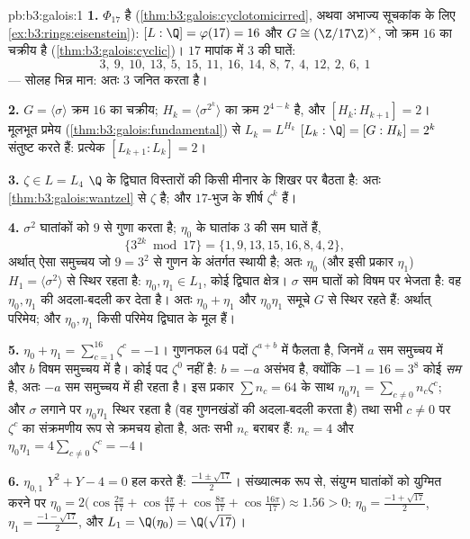 \begin{solution}{pb:b3:galois:1}
\textbf{1.} $\Phi_{17}$  है (\cref{thm:b3:galois:cyclotomicirred}, अथवा अभाज्य सूचकांक के लिए
\cref{ex:b3:rings:eisenstein}): $[L:\Q] =
\varphi(17) = 16$ और $G \cong (\Z/17\Z)^\times$, जो क्रम $16$ का चक्रीय है (\cref{thm:b3:galois:cyclic})। $17$
मापांक में $3$ की घातें:
\[
3,\ 9,\ 10,\ 13,\ 5,\ 15,\ 11,\ 16,\ 14,\ 8,\ 7,\ 4,\ 12,\ 2,\
6,\ 1
\]
--- सोलह भिन्न मान: अतः $3$ जनित करता है।

\textbf{2.} $G = \langle\sigma\rangle$ क्रम $16$ का चक्रीय; $H_k = \langle\sigma^{2^k}\rangle$ का क्रम $2^{4-k}$ है, और
$[H_k : H_{k+1}] = 2$। मूलभूत प्रमेय (\cref{thm:b3:galois:fundamental}) से $L_k = L^{H_k}$ $[L_k : \Q] = [G : H_k] = 2^k$ संतुष्ट करते हैं:
प्रत्येक $[L_{k+1}:L_k] = 2$।

\textbf{3.} $\zeta \in L = L_4$ $\Q$ के द्विघात विस्तारों की किसी मीनार के शिखर
पर बैठता है: अतः \cref{thm:b3:galois:wantzel} से $\zeta$  है; और $17$-भुज के शीर्ष
$\zeta^k$ हैं।

\textbf{4.} $\sigma^2$ घातांकों को $9$ से गुणा करता है; $\eta_0$ के घातांक
$3$ की सम घातें हैं,
\[
\{3^{2k} \bmod 17\} = \{1, 9, 13, 15, 16, 8, 4, 2\},
\]
अर्थात् ऐसा समुच्चय जो $9 = 3^2$ से गुणन के अंतर्गत स्थायी है; अतः
$\eta_0$ (और इसी प्रकार $\eta_1$) $H_1 =
\langle\sigma^2\rangle$ से स्थिर रहता है: $\eta_0, \eta_1 \in L_1$, कोई
द्विघात क्षेत्र। $\sigma$ सम घातों को विषम पर भेजता है: वह $\eta_0,
\eta_1$ की
अदला-बदली कर देता है। अतः $\eta_0 + \eta_1$ और $\eta_0\eta_1$ समूचे $G$ से स्थिर रहते
हैं: अर्थात् परिमेय; और $\eta_0, \eta_1$ किसी परिमेय द्विघात के मूल हैं।

\textbf{5.} $\eta_0 + \eta_1 = \sum_{c=1}^{16}\zeta^c = -1$। गुणनफल $64$ पदों $\zeta^{a + b}$ में फैलता है, जिनमें
$a$ सम समुच्चय में और $b$ विषम समुच्चय में है। कोई पद $\zeta^0$ नहीं
है: $b = -a$ असंभव है, क्योंकि $-1 = 16 = 3^8$ कोई \emph{सम}  है, अतः $-a$
सम समुच्चय में ही रहता है। इस प्रकार $\sum n_c = 64$ के साथ $\eta_0\eta_1 = \sum_{c \neq 0}
n_c\zeta^c$; और $\sigma$
लगाने पर $\eta_0\eta_1$ स्थिर रहता है (वह गुणनखंडों की अदला-बदली करता है)
तथा सभी $c \neq 0$ पर $\zeta^c$ का संक्रमणीय रूप से क्रमचय होता है, अतः सभी
$n_c$ बराबर हैं: $n_c
= 4$ और $\eta_0\eta_1 = 4\sum_{c\neq0}\zeta^c = -4$।

\textbf{6.} $\eta_{0,1}$ $Y^2 + Y - 4 = 0$ हल करते हैं: $\frac{-1 \pm
\sqrt{17}}2$। संख्यात्मक रूप से,
संयुग्म घातांकों को युग्मित करने पर $\eta_0 = 2\bigl(\cos\tfrac{2\pi}{17} + \cos\tfrac{4\pi}{17} +
\cos\tfrac{8\pi}{17} + \cos\tfrac{16\pi}{17}\bigr) \approx 1.56
> 0$: $\eta_0 = \frac{-1+\sqrt{17}}2$, $\eta_1 =
\frac{-1-\sqrt{17}}2$, और $L_1 = \Q(\eta_0) = \Q(\sqrt{17})$।


\end{solution}
